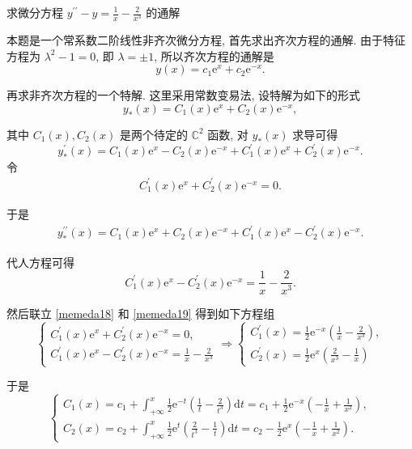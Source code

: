 \begin{solution}
    求微分方程 $y^{\prime \prime}-y=\frac{1}{x}-\frac{2}{x^3}$ 的通解

    本题是一个常系数二阶线性非齐次微分方程, 首先求出齐次方程的通解. 由于特征方程为 $\lambda^2-1=0$, 即 $\lambda= \pm 1$, 所以齐次方程的通解是
    $$
        y(x)=c_1 \mathrm{e}^x+c_2 \mathrm{e}^{-x} .
    $$

    再求非齐次方程的一个特解. 这里采用常数变易法, 设特解为如下的形式
    $$
        y_*(x)=C_1(x) \mathrm{e}^x+C_2(x) \mathrm{e}^{-x},
    $$

    其中 $C_1(x), C_2(x)$ 是两个待定的 $\mathbb{C}^2$ 函数, 对 $y_*(x)$ 求导可得
    $$
        y_*^{\prime}(x)=C_1(x) \mathrm{e}^x-C_2(x) \mathrm{e}^{-x}+C_1^{\prime}(x) \mathrm{e}^x+C_2^{\prime}(x) \mathrm{e}^{-x} .
    $$
    令
    \begin{align}\label{memeda18}
        C_1^{\prime}(x) \mathrm{e}^x+C_2^{\prime}(x) \mathrm{e}^{-x}=0 .
    \end{align}

    于是
    \begin{align}\label{memeda19}
        y_*^{\prime \prime}(x)=C_1(x) \mathrm{e}^x+C_2(x) \mathrm{e}^{-x}+C_1^{\prime}(x) \mathrm{e}^x-C_2^{\prime}(x) \mathrm{e}^{-x} .
    \end{align}

    代人方程可得
    $$
        C_1^{\prime}(x) \mathrm{e}^x-C_2^{\prime}(x) \mathrm{e}^{-x}=\frac{1}{x}-\frac{2}{x^3} .
    $$

    然后联立 \cref{memeda18} 和 \cref{memeda19} 得到如下方程组
    $$
        \left\{\begin{array} { l }
            { C _ { 1 } ^ { \prime } ( x ) \mathrm { e } ^ { x } + C _ { 2 } ^ { \prime } ( x ) \mathrm { e } ^ { - x } = 0 , } \\
            { C _ { 1 } ^ { \prime } ( x ) \mathrm { e } ^ { x } - C _ { 2 } ^ { \prime } ( x ) \mathrm { e } ^ { - x } = \frac { 1 } { x } - \frac { 2 } { x ^ { 3 } } }
        \end{array} \Rightarrow \left\{\begin{array}{l}
            C_1^{\prime}(x)=\frac{1}{2} \mathrm{e}^{-x}\left(\frac{1}{x}-\frac{2}{x^3}\right), \\
            C_2^{\prime}(x)=\frac{1}{2} \mathrm{e}^x\left(\frac{2}{x^3}-\frac{1}{x}\right)
        \end{array}\right.\right.
    $$

    于是
    $$
        \left\{\begin{array}{l}
            C_1(x)=c_1+\int_{+\infty}^x \frac{1}{2} \mathrm{e}^{-t}\left(\frac{1}{t}-\frac{2}{t^3}\right) \mathrm{d} t=c_1+\frac{1}{2} \mathrm{e}^{-x}\left(-\frac{1}{x}+\frac{1}{x^2}\right), \\
            C_2(x)=c_2+\int_{+\infty}^x \frac{1}{2} \mathrm{e}^t\left(\frac{2}{t^3}-\frac{1}{t}\right) \mathrm{d} t=c_2-\frac{1}{2} \mathrm{e}^x\left(-\frac{1}{x}+\frac{1}{x^2}\right) .
        \end{array}\right.
    $$


\end{solution}
